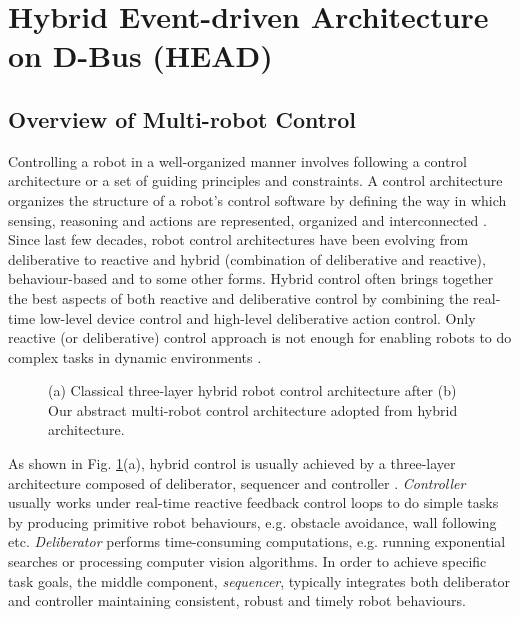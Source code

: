 \documentclass{ifacconf}
\begin{document}
\section{Hybrid Event-driven Architecture on D-Bus (HEAD)}
\label{sec:head}
\subsection{Overview of Multi-robot Control}
Controlling a robot in a well-organized manner involves following a control architecture or a set of guiding principles and constraints. A control architecture organizes the structure  of a robot's control software by defining the way in which sensing, reasoning and actions are represented, organized and interconnected \citep{Bekey2005}. Since last few decades, robot control architectures have been evolving from deliberative to reactive and hybrid (combination of deliberative and reactive), behaviour-based and to some other forms.  Hybrid control often brings together the best aspects of both reactive and deliberative control by combining the real-time low-level device control and high-level deliberative action control. Only reactive (or deliberative) control approach is not enough for enabling robots to do complex tasks in dynamic environments \citep{Gat1997}.\\
\begin{figure}
\centering
{} 
\hspace{0.25cm}
\caption{(a) Classical three-layer hybrid robot control architecture after \cite{Gat1997} 
(b) Our abstract multi-robot control architecture adopted from hybrid architecture.}
\label{fig:three-layer-arch}
\end{figure}
As shown in Fig. \ref{fig:three-layer-arch}(a), hybrid control is usually achieved by a three-layer architecture composed of deliberator, sequencer and controller . {\em Controller} usually works under real-time reactive feedback control loops to do simple tasks by producing primitive robot behaviours, e.g. obstacle avoidance, wall following etc. {\em Deliberator} performs time-consuming computations, e.g. running exponential searches or processing computer vision algorithms. In order to achieve specific task goals, the middle component, {\em sequencer}, typically integrates both deliberator and controller maintaining consistent, robust and timely robot behaviours.\\
\end{document}
